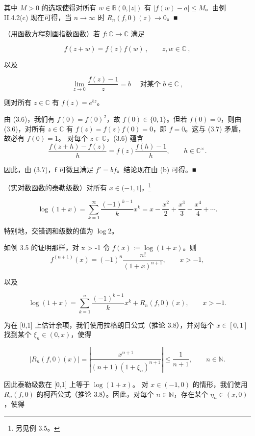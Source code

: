 \begin{application}
\begin{items}
其中 $ M > 0 $ 的选取使得对所有 $ w \in \mathbb{B}(0, |z|) $ 有 $ |f(w) - a| \leq M $。由例 II.4.2(c) 现在可得，当 $ n \to \infty $ 时 $ R_n(f, 0)(z) \to 0 $。■

\item

（用函数方程刻画指数函数）若 $ f: \mathbb{C} \to \mathbb{C} $ 满足

\begin{equation}
f(z+w)=f(z)f(w)~,\qquad z,w\in\mathbb{C}~,
\end{equation}

以及

\begin{equation}
\lim_{z\to0}\frac{f(z)-1}{z}=b\quad\text{ 对某个 } b\in\mathbb{C}~,
\end{equation}

则对所有 $ z \in \mathbb{C} $ 有 $ f(z) = e^{bz} $。

\proofhead
由 (3.6)，我们有 $ f(0) = f(0)^2 $，故 $ f(0) \in \{0,1\} $。但若 $ f(0) = 0 $，则由 (3.6)，对所有 $ z \in \mathbb{C} $ 有 $ f(z) = f(z)f(0) = 0 $，即 $ f = 0 $。这与 (3.7) 矛盾，故必有 $ f(0) = 1 $。
对每个 $ z \in \mathbb{C} $，(3.6) 蕴含
\[
\frac{f(z+h)-f(z)}{h}=f(z)\frac{f(h)-1}{h},\qquad h\in\mathbb{C}^{\times}.
\]

因此，由 (3.7)，f 可微且满足 $ f' = bf $。结论现在由 (b) 可得。■

\item

（实对数函数的泰勒级数）对所有 $ x \in (-1,1] $，\footnote{另见例 3.5。}

\[
\log(1+x)=\sum_{k=1}^{\infty}\frac{(-1)^{k-1}}{k}x^{k}=x-\frac{x^{2}}{2}+\frac{x^{3}}{3}-\frac{x^{4}}{4}+\cdots.
\]

特别地，交错调和级数的值为 $ \log 2 $。

\proofhead
如例 3.5 的证明那样，对 x > -1 令 $ f(x) := \log(1 + x) $。则
\[
f^{(n+1)}(x)=(-1)^{n}\frac{n!}{(1+x)^{n+1}},\qquad x>-1,
\]

以及

\[
\log(1+x)=\sum_{k=1}^{n}\frac{(-1)^{k-1}}{k}x^{k}+R_{n}(f,0)(x),\qquad x>-1.
\]

为在 [0,1] 上估计余项，我们使用拉格朗日公式（推论 3.8），并对每个 $ x \in [0,1] $ 找到某个 $ \xi_n \in (0,x) $，使得

\[
|R_{n}(f,0)(x)|=\left|\frac{x^{n+1}}{(n+1)(1+\xi_{n})^{n+1}}\right|\leq\frac{1}{n+1},\qquad n\in\mathbb{N}.
\]

因此泰勒级数在 [0,1] 上等于 $ \log(1+x) $。
对 $ x \in (-1,0) $ 的情形，我们使用 $ R_n(f,0) $ 的柯西公式（推论 3.8）。因此，对每个 $ n \in \mathbb{N} $，存在某个 $ \eta_n \in (x,0) $，使得


\end{items}
\end{application}
